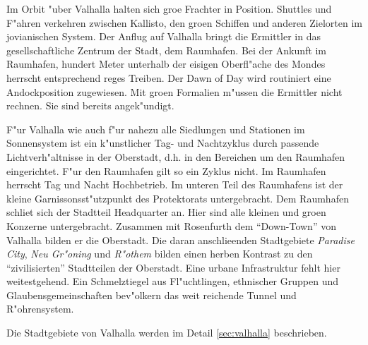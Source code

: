 

Im Orbit "uber Valhalla halten sich gro\3e Frachter in Position. Shuttles und F"ahren verkehren zwischen Kallisto, den gro\3en Schiffen und anderen Zielorten im jovianischen System. Der Anflug auf Valhalla bringt die Ermittler in das gesellschaftliche Zentrum der Stadt, dem Raumhafen. Bei der Ankunft im Raumhafen, hundert Meter unterhalb der eisigen Oberfl"ache des Mondes herrscht entsprechend reges Treiben. Der Dawn of Day wird routiniert eine Andockposition zugewiesen. Mit gro\3en Formalien m"ussen die Ermittler nicht rechnen. Sie sind bereits angek"undigt. 

F"ur Valhalla wie auch f"ur nahezu alle Siedlungen und Stationen im Sonnensystem ist ein k"unstlicher Tag- und Nachtzyklus durch passende Lichtverh"altnisse in der Oberstadt, d.h. in den Bereichen um den Raumhafen eingerichtet. F"ur den Raumhafen gilt so ein Zyklus nicht. Im Raumhafen herrscht Tag und Nacht Hochbetrieb. Im unteren Teil des Raumhafens ist der kleine Garnissonsst"utzpunkt des Protektorats untergebracht. Dem Raumhafen schlie\3t sich der Stadtteil Headquarter an. Hier sind alle kleinen und gro\3en Konzerne untergebracht. Zusammen mit Rosenfurth dem "`Down-Town"' von Valhalla bilden er die Oberstadt. Die daran anschlie\3enden Stadtgebiete \emph{Paradise City}, \emph{Neu Gr"oning} und \emph{R"othem} bilden einen herben Kontrast zu den "`zivilisierten"' Stadtteilen der Oberstadt. Eine urbane Infrastruktur fehlt hier weitestgehend. Ein Schmelztiegel aus Fl"uchtlingen, ethnischer Gruppen und Glaubensgemeinschaften bev"olkern das weit reichende Tunnel und R"ohrensystem.

\begin{remarks}
    Die Stadtgebiete von Valhalla werden im Detail \cref{sec:valhalla} beschrieben.
\end{remarks}